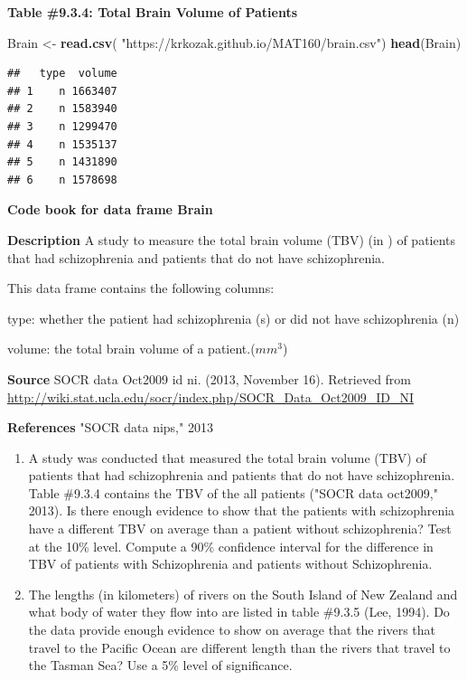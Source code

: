 \documentclass[
]{book}
\newenvironment{Shaded}{\begin{snugshade}}{\end{snugshade}}
\newcommand{\KeywordTok}[1]{\textcolor[rgb]{0.13,0.29,0.53}{\textbf{#1}}}
\newcommand{\NormalTok}[1]{#1}
\newcommand{\StringTok}[1]{\textcolor[rgb]{0.31,0.60,0.02}{#1}}
\begin{document}
\textbf{Table \#9.3.4: Total Brain Volume of Patients}

\begin{Shaded}
\begin{Highlighting}[]
\NormalTok{Brain <-}\StringTok{ }\KeywordTok{read.csv}\NormalTok{(}
  \StringTok{"https://krkozak.github.io/MAT160/brain.csv"}\NormalTok{)}
\KeywordTok{head}\NormalTok{(Brain)}
\end{Highlighting}
\end{Shaded}

\begin{verbatim}
##   type  volume
## 1    n 1663407
## 2    n 1583940
## 3    n 1299470
## 4    n 1535137
## 5    n 1431890
## 6    n 1578698
\end{verbatim}

\textbf{Code book for data frame Brain}

\textbf{Description}
A study to measure the total brain volume (TBV) (in ) of patients that had schizophrenia and patients that do not have schizophrenia.

This data frame contains the following columns:

type: whether the patient had schizophrenia (s) or did not have schizophrenia (n)

volume: the total brain volume of a patient.(\(mm^3\))

\textbf{Source}
SOCR data Oct2009 id ni. (2013, November 16). Retrieved from
\url{http://wiki.stat.ucla.edu/socr/index.php/SOCR_Data_Oct2009_ID_NI}

\textbf{References}
"SOCR data nips," 2013

\begin{enumerate}
\def\labelenumi{\arabic{enumi}.}
\setcounter{enumi}{3}
\item
  A study was conducted that measured the total brain volume (TBV) of patients that had schizophrenia and patients that do not have schizophrenia. Table \#9.3.4 contains the TBV of the all patients ("SOCR data oct2009," 2013). Is there enough evidence to show that the patients with schizophrenia have a different TBV on average than a patient without schizophrenia? Test at the 10\% level. Compute a 90\% confidence interval for the difference in TBV of patients with Schizophrenia and patients without Schizophrenia.
\item
  The lengths (in kilometers) of rivers on the South Island of New Zealand and what body of water they flow into are listed in table \#9.3.5 (Lee, 1994). Do the data provide enough evidence to show on average that the rivers that travel to the Pacific Ocean are different length than the rivers that travel to the Tasman Sea? Use a 5\% level of significance.
\end{enumerate}
\end{document}
